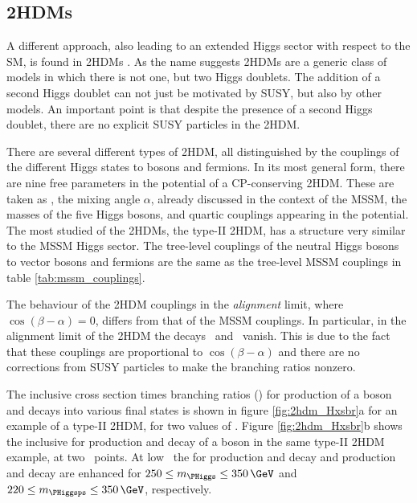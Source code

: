 \subsection{\acl{2HDM}s}
\label{sec:theory_2HDM}
A different approach, also leading to an extended Higgs sector with
respect to the \ac{SM}, is found in \acp{2HDM} \cite{2HDM-I,2HDM-II}.
As the name suggests \acp{2HDM} are a generic class of models in which
there is not one, but two Higgs doublets. The addition of a second
Higgs doublet can not just be motivated by \ac{SUSY}, but also by other models.
An important point is that despite the presence of a second 
Higgs doublet, there are no explicit \ac{SUSY} particles in the \ac{2HDM}.

There are several different types of \ac{2HDM}, all distinguished by the couplings
of the different Higgs states to bosons and fermions. In its most general
form, there are nine free parameters in the potential of a CP-conserving 2HDM. 
These are taken as \tanb, the mixing angle $\alpha$, already discussed in 
the context of the \ac{MSSM}, the masses of the five Higgs bosons,
and quartic couplings appearing in the potential. The most studied of the
\ac{2HDM}s, the type-II \ac{2HDM}, has a structure very similar to 
the MSSM Higgs sector. The tree-level couplings of the neutral Higgs bosons to 
vector bosons and fermions are the same as the tree-level \ac{MSSM} couplings 
in table \ref{tab:mssm_couplings}. %

The behaviour of the \ac{2HDM} couplings in the \textit{alignment} limit,
where $\cos{(\beta-\alpha)} = 0$, differs from that of the \ac{MSSM} couplings.
In particular, in the alignment limit of the \ac{2HDM} the decays \AtoZh~and \Htohh~vanish.
This is due to the fact that these couplings are
proportional to $\cos{(\beta-\alpha)}$ and there are no corrections
from \ac{SUSY} particles to make the branching ratios nonzero.

The inclusive cross section times branching ratios (\xsbr) for production of a \PHiggs boson 
and decays into various final states is shown in figure \ref{fig:2hdm_Hxsbr}a for an 
example of a type-II \ac{2HDM}, for two values of \tanb. Figure \ref{fig:2hdm_Hxsbr}b 
shows the inclusive \xsbr for production and decay
of a \PHiggsps boson in the same type-II \ac{2HDM} example, at two \tanb~points. At
low \tanb~the \xsbr for \Htohh production and decay and \AtoZh production
and decay are enhanced for $250\leq m_{\PHiggs}\leq 350\,\GeV$ and $220 \leq m_{\PHiggsps} \leq 350\,\GeV$, respectively.

